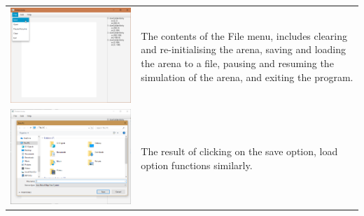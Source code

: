 \begin{longtabu}{rX}
    \includegraphics[width=0.4\linewidth,valign=t]{img/05.png} & The contents of the File menu, includes clearing and re-initialising the arena, saving and loading the arena to a file, pausing and resuming the simulation of the arena, and exiting the program. \\
    \includegraphics[width=0.4\linewidth,valign=t]{img/06.png} & The result of clicking on the save option, load option functions similarly.
\end{longtabu}